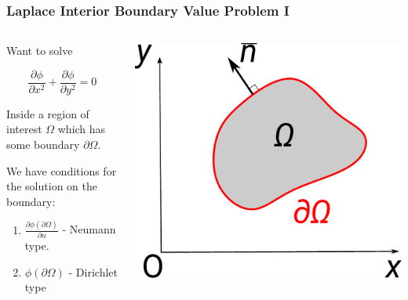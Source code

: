 \begin{frame}
    \frametitle{Laplace Interior Boundary Value Problem I}
    \begin{columns}
        \begin{column}{0.5\textwidth}

            Want to solve

            \begin{equation}
                \frac{\partial \phi}{\partial x^2} +  \frac{\partial \phi}{\partial y^2} = 0
            \end{equation}

            Inside a region of interest $\Omega$ which has some boundary $\partial \Omega$.


            \hspace*{5pt}

            We have conditions for the solution on the boundary:

            \begin{enumerate}
                    \item $\frac{\partial \phi(\partial \Omega)}{\partial n}$ - Neumann type.
                    \item $\phi(\partial \Omega)$ - Dirichlet type
            \end{enumerate}

        \end{column}

        \begin{column}{0.5\textwidth}

        \includegraphics[width=\linewidth]{assets/laplace.pdf}
        \end{column}
    \end{columns}
\end{frame}

